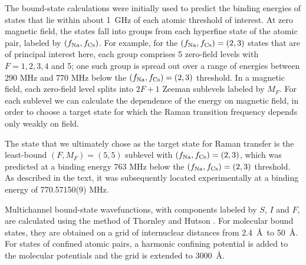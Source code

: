 \documentclass[aps,secnumarabic,amsmath,amssymb,10pt,superscriptaddress]{revtex4}
\begin{document}
The bound-state calculations were initially used to predict the binding energies of states that lie
within about 1~GHz of each atomic threshold of interest. At zero magnetic field, the states fall
into groups from each hyperfine state of the atomic pair, labeled by $(f_{\rm Na},f_{\rm Cs})$. For
example, for the $(f_{\rm Na},f_{\rm Cs}) = (2,3)$ states that are of principal interest here, each
group comprises 5 zero-field levels with $F=1,2,3,4$ and 5; one such group is spread out over a
range of energies between 290 MHz and 770 MHz below the $(f_{\rm Na},f_{\rm Cs}) = (2,3)$
threshold. In a magnetic field, each zero-field level splits into $2F+1$ Zeeman sublevels labeled
by $M_F$. For each sublevel we can calculate the dependence of the energy on magnetic field, in
order to choose a target state for which the Raman transition frequency depends only weakly on
field.

The state that we ultimately chose as the target state for Raman transfer is the least-bound
$(F,M_F)=(5,5)$ sublevel with $(f_{\rm Na},f_{\rm Cs}) = (2,3)$, which was predicted at a binding
energy 763 MHz below the $(f_{\rm Na},f_{\rm Cs}) = (2,3)$ threshold. As described in the text, it
was subsequently located experimentally at a binding energy of 770.57150(9) MHz.

Multichannel bound-state wavefunctions, with components labeled by $S$, $I$ and $F$, are calculated
using the method of Thornley and Hutson \cite{Thornley1994}. For molecular bound states, they are
obtained on a grid of internuclear distances from 2.4~\AA\ to 50~\AA. For states of confined atomic
pairs, a harmonic confining potential is added to the molecular potentials and the grid is extended
to 3000~\AA.
\end{document}
